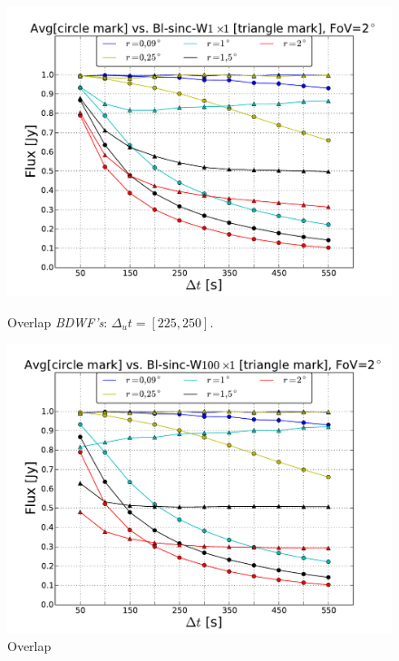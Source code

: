 \documentclass[useAMS,usenatbib]{mn2e}
\begin{document}
\begin{figure}
  \centering
\begin{minipage}{0.45\linewidth}\includegraphics[width=1.\textwidth]{./Figures/max-integ-time-sinc-w1x1fov2.pdf}\caption{
Overlap 
		\textit{BDWF's}: $\Delta_u t= [225, 250]$.}\label{ fig:fig_3a}\end{minipage}
\begin{minipage}{0.45\linewidth}\includegraphics[width=1.\textwidth]{./Figures/max-integ-time-sinc-w100x1fov2.pdf}\caption{Overlap 
}
\end{minipage}
\end{figure}
\end{document}
